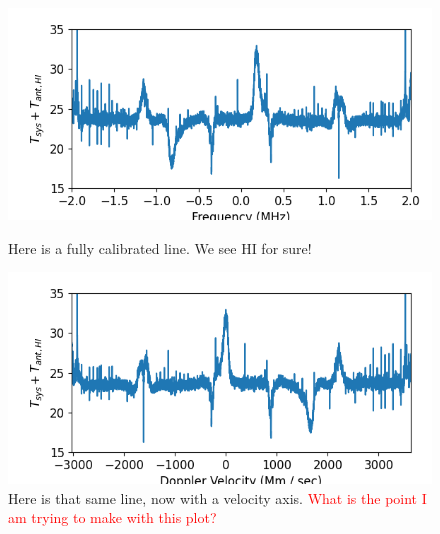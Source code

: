 \documentclass[12pt]{article}
\begin{document}
\begin{figure}
\centering
\begin{minipage}{.45\textwidth}
	\centering
	\includegraphics[width=\linewidth]{up_vs_frq}
	\caption{Here is a fully calibrated line. We see HI for sure!}
	\label{fig:up_vs_frq}
\end{minipage} \hfill%
\begin{minipage}{.45\textwidth}
	\centering
	\includegraphics[width=\linewidth]{up_vs_vel}
	\caption{Here is that same line, now with a velocity axis. \textcolor{red}{What is the point I am trying to make with this plot?}}
	\label{fig:up_vs_vel}
\end{minipage}
\end{figure}

\
\end{document}
